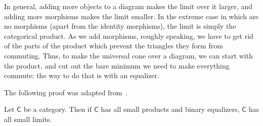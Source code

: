 \documentclass[notes.tex]{subfiles}
\begin{document}
In general, adding more objects to a diagram makes the limit over it larger, and adding more morphisms makes the limit smaller. In the extreme case in which are no morphisms (apart from the identity morphisms), the limit is simply the categorical product. As we add morphisms, roughly speaking, we have to get rid of the parts of the product which prevent the triangles they form from commuting. Thus, to make the universal cone over a diagram, we can start with the product, and cut out the bare minimum we need to make everything commute: the way to do that is with an equalizer.

The following proof was adapted from~\cite{awodey-category-theory}.
\begin{theorem}
  \label{thm:criterionforfinitelimits}
  Let $\mathsf{C}$ be a category. Then if $\mathsf{C}$ has all small products and binary equalizers, $\mathsf{C}$ has all small limits.

\end{theorem}
\end{document}
